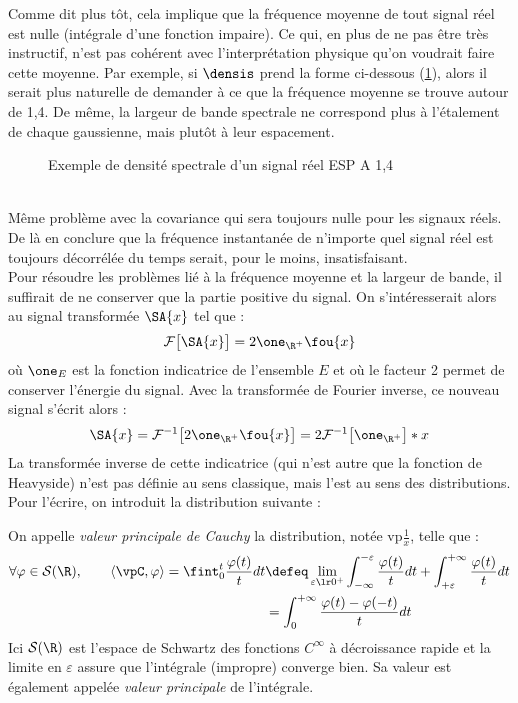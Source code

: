 Comme dit plus tôt, cela implique que la fréquence moyenne de tout signal réel est nulle (intégrale d'une fonction impaire). Ce qui, en plus de ne pas être très instructif, n'est pas cohérent avec l'interprétation physique qu'on voudrait faire cette moyenne. Par exemple, si $\densis$ prend la forme ci-dessous (\cref{fig:densi_spec_sym}), alors il serait plus naturelle de demander à ce que la fréquence moyenne se trouve autour de 1,4. De même, la largeur de bande spectrale ne correspond plus à l'étalement de chaque gaussienne, mais plutôt à leur espacement.
\\
\begin{figure}[h]\centering
	\caption{Exemple de densité spectrale d'un signal réel ESP A 1,4}
	\label{fig:densi_spec_sym}
\end{figure}
\\
Même problème avec la covariance qui sera toujours nulle pour les signaux réels. De là en conclure que la fréquence instantanée de n'importe quel signal réel est toujours décorrélée du temps serait, pour le moins, insatisfaisant.
\\

Pour résoudre les problèmes lié à la fréquence moyenne et la largeur de bande, il suffirait de ne conserver que la partie positive du signal. On s'intéresserait alors au signal transformée $\SA{x}$ tel que :
\[\mathcal{F}\big[\SA{x}\big] = 2\one_{\R^+}\fou{x}\]
où $\one_E$ est la fonction indicatrice de l'ensemble $E$ et où le facteur 2 permet de conserver l'énergie du signal.
Avec la transformée de Fourier inverse, ce nouveau signal s'écrit alors :
\[\SA{x} = \mathcal{F}^{-1}\big[ 2\one_{\R^+}\fou{x} \big] = 2 \mathcal{F}^{-1}\big[\one_{\R^+}\big] * x\]
La transformée inverse de cette indicatrice (qui n'est autre que la fonction de Heavyside) n'est pas définie au sens classique, mais l'est au sens des distributions. Pour l'écrire, on introduit la distribution suivante :


\begin{definition}\label{def:vp&Hilb}
	On appelle \emph{valeur principale de Cauchy} la distribution, notée vp$\frac{1}{x}$, telle que :
	\begin{equation}
		\begin{aligned}
		\forall \varphi\in\mathcal{S}(\R),\qquad 
			\left\langle \vpC, \varphi \right\rangle 
			= \fint_0^t \frac{\varphi(t)}{t}dt 
			&\defeq \lim_{\varepsilon\lr0^+} \int_{-\infty}^{-\varepsilon} \frac{\varphi(t)}{t}dt + \int_{+\varepsilon}^{+\infty} \frac{\varphi(t)}{t}dt \\
			&= \int_0^{+\infty} \frac{\varphi(t) - \varphi(-t)}{t}dt
		\end{aligned}
	\end{equation}
	Ici $\mathcal{S}(\R)$ est l’espace de Schwartz des fonctions $C^\infty$ à décroissance rapide et la limite en $\varepsilon$ assure que l'intégrale (impropre) converge bien. Sa valeur est également appelée \emph{valeur principale} de l'intégrale. 
\end{definition}

